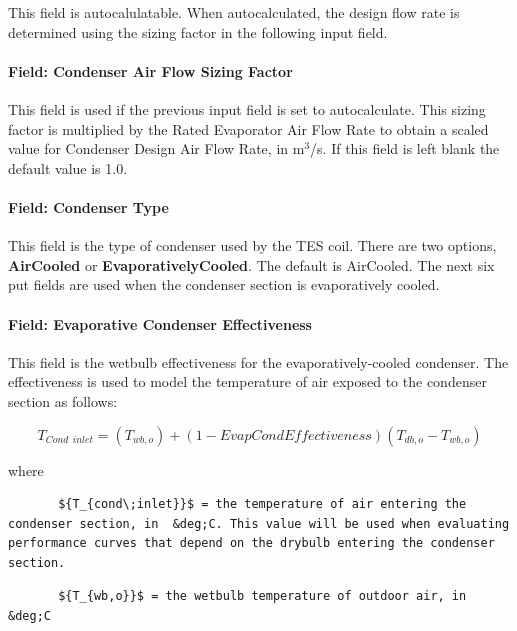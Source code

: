 This field is autocalulatable. When autocalculated, the design flow rate is determined using the sizing factor in the following input field.

\paragraph{Field: Condenser Air Flow Sizing Factor}\label{field-condenser-air-flow-sizing-factor}

This field is used if the previous input field is set to autocalculate. This sizing factor is multiplied by the Rated Evaporator Air Flow Rate to obtain a scaled value for Condenser Design Air Flow Rate, in m\(^{3}\)/s. If this field is left blank the default value is 1.0.

\paragraph{Field: Condenser Type}\label{field-condenser-type-5}

This field is the type of condenser used by the TES coil. There are two options, \textbf{AirCooled} or \textbf{EvaporativelyCooled}. The default is AirCooled. The next six put fields are used when the condenser section is evaporatively cooled.

\paragraph{Field: Evaporative Condenser Effectiveness}\label{field-evaporative-condenser-effectiveness-2}

This field is the wetbulb effectiveness for the evaporatively-cooled condenser. The effectiveness is used to model the temperature of air exposed to the condenser section as follows:

\begin{equation}
{T_{Cond\,\;inlet}} = \left( {{T_{wb,o}}} \right) + \left( {1 - EvapCondEffectiveness} \right)\left( {{T_{db,o}} - {T_{wb,o}}} \right)
\end{equation}

where

\begin{lstlisting}
       ${T_{cond\;inlet}}$ = the temperature of air entering the condenser section, in  &deg;C. This value will be used when evaluating performance curves that depend on the drybulb entering the condenser section.
\end{lstlisting}

\begin{lstlisting}
       ${T_{wb,o}}$ = the wetbulb temperature of outdoor air, in  &deg;C
\end{lstlisting}

